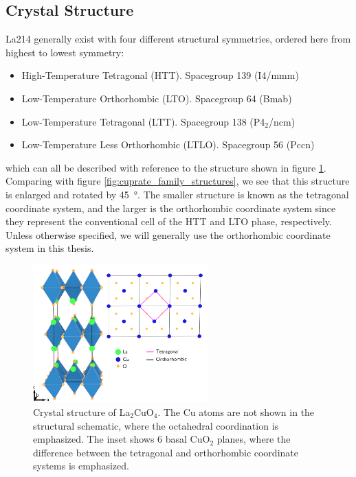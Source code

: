 \subsection{Crystal Structure}
La214 generally exist with four different structural symmetries, ordered here from highest to lowest symmetry:

\begin{itemize}
    \item High-Temperature Tetragonal (HTT). Spacegroup 139 (I4/mmm)
    \item Low-Temperature Orthorhombic (LTO). Spacegroup 64 (Bmab)
    \item Low-Temperature Tetragonal (LTT). Spacegroup 138 (P4$_2$/ncm)
    \item Low-Temperature Less Orthorhombic (LTLO). Spacegroup 56 (Pccn)
\end{itemize}

\noindent which can all be described with reference to the structure shown in figure \ref{fig:htt_lto_coordinates}. Comparing with figure \ref{fig:cuprate_family_structures}, we see that this structure is enlarged and rotated by \SI{45}{\degree}. The smaller structure is known as the tetragonal coordinate system, and the larger is the orthorhombic coordinate system since they represent the conventional cell of the HTT and LTO phase, respectively. Unless otherwise specified, we will generally use the orthorhombic coordinate system in this thesis.

\begin{figure}
    \centering
    \includegraphics[width=0.6\textwidth]{fig/intro/coordinates.png}
    \caption{Crystal structure of La$_2$CuO$_4$. The Cu atoms are not shown in the structural schematic, where the octahedral coordination is emphasized. The inset shows 6 basal CuO$_2$ planes, where the difference between the tetragonal and orthorhombic coordinate systems is emphasized.}
    \label{fig:htt_lto_coordinates}
\end{figure}

